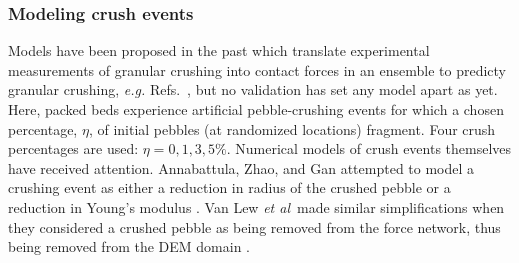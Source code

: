 \begin{table}[ht]
\centering
\caption{Transport properties of helium and boundary conditions in the CFD domain; mean values over the temperature range \SIrange{400}{900}{\celsius}.}
\label{tab:fluid-props}
\end{table}



\subsubsection{Modeling crush events}
Models have been proposed in the past which translate experimental measurements of granular crushing into contact forces in an ensemble to predicty granular crushing, \textit{e.g.} Refs.~\cite{Gan:2010kc,Russell2009,Zhao2012,VanLew2015a,Annabattula2014}, but no validation has set any model apart as yet. Here, packed beds experience artificial pebble-crushing events for which a chosen percentage, $\eta$, of initial pebbles (at randomized locations) fragment. Four crush percentages are used: $\eta = 0, 1, 3, 5\%$. Numerical models of crush events themselves have received attention. Annabattula, Zhao, and Gan attempted to model a crushing event as either a reduction in radius of the crushed pebble or a reduction in Young's modulus \cite{Annabattula2011,Zhao2013,Annabattula2012a}. Van Lew \textit{et al}~made similar simplifications when they considered a crushed pebble as being removed from the force network, thus being removed from the DEM domain \cite{VanLew2014}. 


